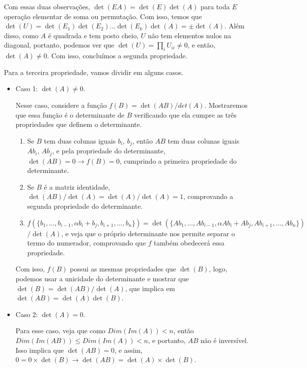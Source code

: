 \documentclass[11pt, a4paper]{article}
\begin{document}
Com essas duas observações, \(\det(EA)=\det(E)\det(A)\) para toda \(E\) operação elementar de soma ou permutação. Com isso, temos que \(\det(U)=\det(E_1)\det(E_2)...\det(E_k)\det(A)=\pm\det(A)\). Além disso, como \(A\) é quadrada e tem posto cheio, \(U\) não tem elementos nulos na diagonal, portanto, podemos ver que  \(\det(U)=\prod_{i}U_{ii} \ne 0\), e então, \(\det(A) \ne 0\). Com isso, concluímos a segunda propriedade.

Para a terceira propriedade, vamos dividir em alguns casos.

\begin{itemize}
    \item Caso 1: \(\det(A) \ne 0\).

    Nesse caso, considere a função \(f(B)=\det(AB)/det(A)\). Mostraremos que essa função é o determinante de \(B\) verificando que ela cumpre as três propriedades que definem o determinante.
    
    \begin{enumerate}
        \item Se \(B\) tem duas colunas iguais \(b_i\), \(b_j\), então \(AB\) tem duas colunas iguais \(Ab_i\), \(Ab_j\), e pela propriedade do determinante, \(\det(AB)=0 \rightarrow f(B)=0\), cumprindo a primeira propriedade do determinante.
        \item Se \(B\) é a matriz identidade, \(\det(AB)/\det(A)=\det(A)/\det(A)=1\), comprovando a segunda propriedade do determinante.
        \item \(f(\{b_1,...,b_{i-1},\alpha b_i+b_j,b_{i+1},...,b_n\})=\det(\{Ab_1,...,Ab_{i-1},\alpha A b_i+Ab_j,Ab_{i+1},...,Ab_n\})\) \(/\det(A)\), e veja que o próprio determinante nos permite separar o termo do numerador, comprovando que \(f\) também obedecerá essa propriedade.
    \end{enumerate}

    Com isso, \(f(B)\) possui as mesmas propriedades que \(\det(B)\), logo, podemos usar a unicidade do determinante e mostrar que \(\det(B)=\det(AB)/\det(A)\), que implica em \(\det(AB)=\det(A)\det(B)\).

    \item Caso 2: \(\det(A) = 0\).

    Para esse caso, veja que como \(Dim(Im(A))<n\), então \(Dim(Im(AB)) \leq Dim(Im(A))<n\), e portanto, \(AB\) não é inversível. Isso implica que \(\det(AB)=0\), e assim, \(0=0\times \det(B) \rightarrow \det(AB)=\det(A) \times \det(B)\).
    
\end{itemize}
\end{document}
